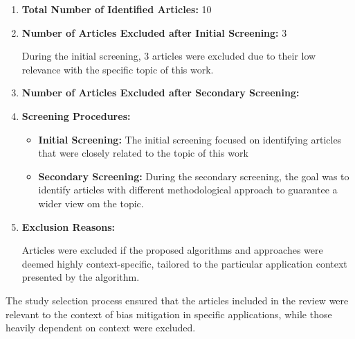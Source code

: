 \documentclass{article}
\begin{document}
    \begin{enumerate}
        \item \textbf{Total Number of Identified Articles:} 10
        \item \textbf{Number of Articles Excluded after Initial Screening:} 3
        
        During the initial screening, 3 articles were excluded due to their low relevance with the specific topic of this work.
        
        \item \textbf{Number of Articles Excluded after Secondary Screening:} 
        
        \item \textbf{Screening Procedures:}
        
        \begin{itemize}
            \item \textbf{Initial Screening:} The initial screening focused on identifying articles that were closely related to the topic of this work
            
            \item \textbf{Secondary Screening:} During the secondary screening, the goal was to identify articles with different methodological approach to guarantee a wider view om the topic.
        \end{itemize}
        
        \item \textbf{Exclusion Reasons:}
        
        Articles were excluded if the proposed algorithms and approaches were deemed highly context-specific, tailored to the particular application context presented by the algorithm.
    
    \end{enumerate}
    
    The study selection process ensured that the articles included in the review were relevant to the context of bias mitigation in specific applications, while those heavily dependent on context were excluded.
\end{document}
